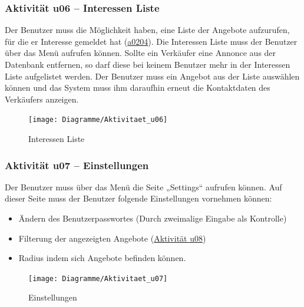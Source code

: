 \documentclass[a4paper,12pt,oneside]{scrartcl}
\begin{document}
\subsubsection{Aktivität u06 – Interessen Liste}
Der Benutzer muss die Möglichkeit haben, eine Liste der Angebote aufzurufen, für die er Interesse gemeldet hat (\hyperlink{u02}{a0204}).
Die Interessen Liste muss der Benutzer über das Menü aufrufen können. 
Sollte ein Verkäufer eine Annonce aus der Datenbank entfernen, so darf diese bei keinem Benutzer mehr in der Interessen Liste aufgelistet werden.
Der Benutzer muss ein Angebot aus der Liste auswählen können und das System muss ihm daraufhin erneut die Kontaktdaten des Verkäufers anzeigen.

\begin{figure}[!htbp]
\centering
\noindent\texttt{[image: Diagramme/Aktivitaet\_u06]}
\caption{Interessen Liste}
\end{figure}
\FloatBarrier


\subsubsection{Aktivität u07 – Einstellungen}
Der Benutzer muss über das Menü die Seite „Settings“ aufrufen können.
Auf dieser Seite muss der Benutzer folgende Einstellungen vornehmen können:
\begin{itemize}
	\item Ändern des Benutzerpasswortes (Durch zweimalige Eingabe als Kontrolle)
	\item Filterung der angezeigten Angebote (\hyperlink{u08}{Aktivität u08})
	\item Radius indem sich Angebote befinden können.
\end{itemize}

\begin{figure}[!htbp]
\centering
\noindent\texttt{[image: Diagramme/Aktivitaet\_u07]}
\caption{Einstellungen}
\end{figure}
\FloatBarrier
\end{document}
